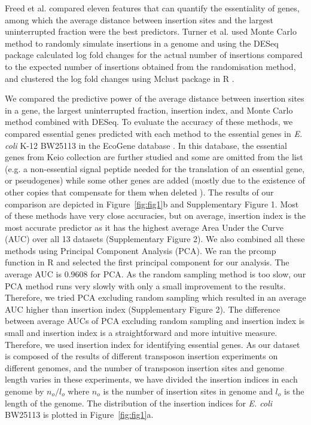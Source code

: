 \documentclass[12pt,letterpaper]{article}
\begin{document}
Freed et al. \cite{freed_combining_2016} compared eleven features that can quantify the essentiality of genes, among which the average distance between insertion sites and the largest uninterrupted fraction were the best predictors. Turner et al. \cite{turner_essential_2015} used Monte Carlo method to randomly simulate insertions in a genome and using the DESeq package \cite{anders_differential_2010} calculated log fold changes for the actual number of insertions compared to the expected number of insertions obtained from the randomisation method, and clustered the log fold changes using Mclust package in R \cite{scrucca_mclust_2016}.

We compared the predictive power of the average distance between insertion sites in a gene, the largest uninterrupted fraction, insertion index, and Monte Carlo method combined with DESeq. To evaluate the accuracy of these methods, we compared essential genes predicted with each method to the essential genes in \textit{E. coli} K-12 BW25113 in the EcoGene database \cite{zhou_ecogene_2013}. In this database, the essential genes from Keio collection \cite{baba_construction_2006} are further studied and some are omitted from the list (e.g. a non-essential signal peptide needed for the translation of an essential gene, or pseudogenes) while some other genes are added (mostly due to the existence of other copies that compensate for them when deleted \cite{yamamoto_update_2009}). The results of our comparison are depicted in Figure~\ref{fig:fig1}b and Supplementary Figure 1. Most of these methods have very close accuracies, but on average, insertion index is the most accurate predictor as it has the highest average Area Under the Curve (AUC) over all 13 datasets (Supplementary Figure 2). We also combined all these methods using Principal Component Analysis (PCA). We ran the prcomp function in R and selected the first principal component for our analysis. The average AUC is 0.9608 for PCA. As the random sampling method is too slow, our PCA method runs very slowly with only a small improvement to the results. Therefore, we tried PCA excluding random sampling which resulted in an average AUC higher than insertion index (Supplementary Figure 2). The difference between average AUCs of PCA excluding random sampling and insertion index is small and insertion index is a straightforward and more intuitive measure. Therefore, we used insertion index for identifying essential genes. As our dataset is composed of the results of different transposon insertion experiments on different genomes, and the number of transposon insertion sites and genome length varies in these experiments, we have divided the insertion indices in each genome by $n_o/l_o$ where $n_o$ is the number of insertion sites in genome and $l_o$ is the length of the genome. The distribution of the insertion indices for \textit{E. coli} BW25113 is plotted in Figure~\ref{fig:fig1}a.
\end{document}
